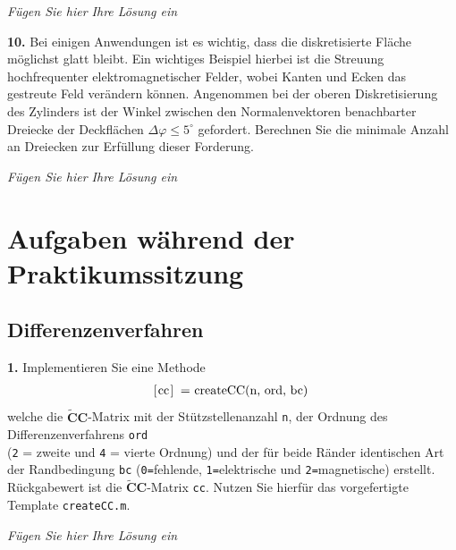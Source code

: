 \documentclass[Protokollheft.tex]{subfiles}
\begin{document}
\emph{Fügen Sie hier Ihre Lösung ein}

    \begin{framed}
	\noindent \textbf{10.} Bei einigen Anwendungen ist es wichtig, dass die diskretisierte Fläche möglichst glatt bleibt. Ein
          wichtiges Beispiel hierbei ist die Streuung hochfrequenter elektromagnetischer Felder, wobei
          Kanten und Ecken das gestreute Feld verändern können. Angenommen bei der oberen
          Diskretisierung des Zylinders ist der Winkel zwischen den Normalenvektoren benachbarter Dreiecke der Deckflächen $\Delta \varphi \leq 5^{\circ}$ gefordert.
          Berechnen Sie die minimale Anzahl an Dreiecken zur Erfüllung dieser Forderung.\label{exer:smoothArea}
\end{framed}

\emph{Fügen Sie hier Ihre Lösung ein}



\section{Aufgaben während der Praktikumssitzung}
{\subsection{Differenzenverfahren}}

        \begin{framed}
	\noindent \textbf{1.} Implementieren Sie eine Methode
                    \begin{align}
                        \lstinline{[cc] = createCC(n, ord, bc)}\; \label{meth:createCC}
                    \end{align}     
                    welche die $\tilde{\textbf{C}}\textbf{C}$-Matrix mit der Stützstellenanzahl \lstinline{n}, der Ordnung des Differenzenverfahrens
                    \lstinline{ord}\\ (\lstinline{2} = zweite und \lstinline{4} = vierte Ordnung) und der für beide Ränder identischen Art der Randbedingung \lstinline{bc} (\lstinline{0=}fehlende, \lstinline{1=}elektrische und  \lstinline{2=}magnetische) erstellt.
                    Rückgabewert ist die $\tilde{\textbf{C}}\textbf{C}$-Matrix \lstinline{cc}. Nutzen Sie hierfür das vorgefertigte Template \lstinline{createCC.m}.\label{exer:createCC}
\end{framed}

\emph{Fügen Sie hier Ihre Lösung ein}
\end{document}
